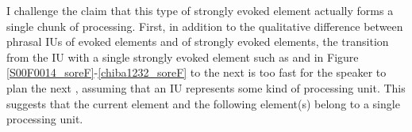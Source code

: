 
I challenge the claim that this type of strongly evoked element actually forms a single chunk of processing.
First,
in addition to the qualitative difference between phrasal IUs of evoked elements and of strongly evoked elements,
the transition from the IU with a single strongly evoked element such as  and  in Figure \ref{S00F0014_soreF}-\ref{chiba1232_soreF} to the next is too fast for the speaker to plan the next ,
assuming that an IU represents some kind of processing unit.
This suggests that the current element and the following element(s) belong to a single processing unit.

